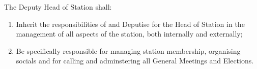 \item The Deputy Head of Station shall:
\begin{enumerate}[label*=\arabic*.]
    \item Inherit the responsibilities of and Deputise for the Head of Station in the management of all aspects of the station, both internally and externally;
    \item Be specifically responsible for managing station membership, organising socials and for calling and adminstering all General Meetings and Elections.
\end{enumerate}

